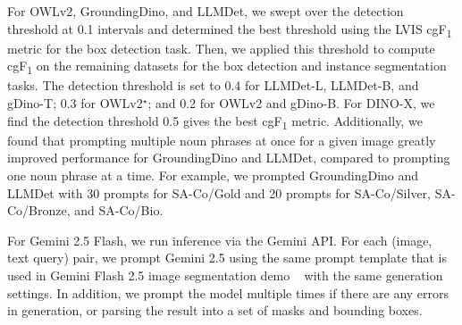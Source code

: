 \documentclass[]{fairmeta}
\newcommand{\dsname}{{SA-Co}\xspace}
\newcommand{\evalgold}{{\dsname/Gold}\xspace}
\newcommand{\evalsilv}{{\dsname/Silver}\xspace}
\newcommand{\evalext}{{\dsname/Bronze}\xspace}
\newcommand{\evalbio}{{\dsname/Bio}\xspace}
\newcommand{\cgf}{cgF\textsubscript{1}\xspace}
\begin{document}
For OWLv2, GroundingDino, and LLMDet, we swept over the detection threshold at 0.1 intervals and determined the best threshold using the LVIS \cgf metric for the box detection task. Then, we applied this threshold to compute \cgf on the remaining datasets for the box detection and instance segmentation tasks. The detection threshold is set to 0.4 for LLMDet-L, LLMDet-B, and gDino-T; 0.3 for OWLv2$^\star$; and 0.2 for OWLv2 and gDino-B. For DINO-X, we find the detection threshold 0.5 gives the best \cgf metric. Additionally, we found that prompting multiple noun phrases at once for a given image greatly improved performance for GroundingDino and LLMDet, compared to prompting one noun phrase at a time. For example, we prompted GroundingDino and LLMDet with 30 prompts for \evalgold and 20 prompts for \evalsilv, \evalext, and \evalbio. 

For Gemini 2.5 Flash, we run inference via the Gemini API. For each (image, text query) pair, we prompt Gemini 2.5 using the same prompt template that is used in Gemini Flash 2.5 image segmentation demo ~\citep{geminiseg2025} with the same generation settings. In addition, we prompt the model multiple times if there are any errors in generation, or parsing the result into a set of masks and bounding boxes.
\end{document}
